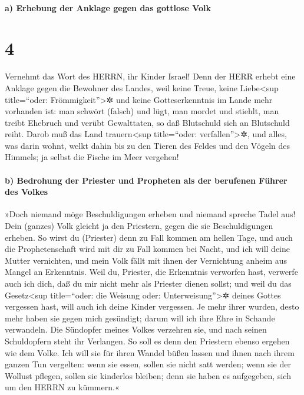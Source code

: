 \hypertarget{a-erhebung-der-anklage-gegen-das-gottlose-volk}{%
\paragraph{a) Erhebung der Anklage gegen das gottlose
Volk}\label{a-erhebung-der-anklage-gegen-das-gottlose-volk}}

\hypertarget{section-3}{%
\section{4}\label{section-3}}

 Vernehmt das Wort des HERRN, ihr Kinder Israel! Denn der
HERR erhebt eine Anklage gegen die Bewohner des Landes, weil keine
Treue, keine Liebe\textless sup title=``oder: Frömmigkeit''\textgreater✲
und keine Gotteserkenntnis im Lande mehr vorhanden ist: 
man schwört (falsch) und lügt, man mordet und stiehlt, man treibt
Ehebruch und verübt Gewalttaten, so daß Blutschuld sich an Blutschuld
reiht.  Darob muß das Land trauern\textless sup
title=``oder: verfallen''\textgreater✲, und alles, was darin wohnt,
welkt dahin bis zu den Tieren des Feldes und den Vögeln des Himmels; ja
selbst die Fische im Meer vergehen!

\hypertarget{b-bedrohung-der-priester-und-propheten-als-der-berufenen-fuxfchrer-des-volkes}{%
\paragraph{b) Bedrohung der Priester und Propheten als der berufenen
Führer des
Volkes}\label{b-bedrohung-der-priester-und-propheten-als-der-berufenen-fuxfchrer-des-volkes}}

 »Doch niemand möge Beschuldigungen erheben und niemand
spreche Tadel aus! Dein (ganzes) Volk gleicht ja den Priestern, gegen
die sie Beschuldigungen erheben.  So wirst du (Priester)
denn zu Fall kommen am hellen Tage, und auch die Prophetenschaft wird
mit dir zu Fall kommen bei Nacht, und ich will deine Mutter vernichten,
 und mein Volk fällt mit ihnen der Vernichtung anheim aus
Mangel an Erkenntnis. Weil du, Priester, die Erkenntnis verworfen hast,
verwerfe auch ich dich, daß du mir nicht mehr als Priester dienen
sollst; und weil du das Gesetz\textless sup title=``oder: die Weisung
oder: Unterweisung''\textgreater✲ deines Gottes vergessen hast, will
auch ich deine Kinder vergessen.  Je mehr ihrer wurden,
desto mehr haben sie gegen mich gesündigt; darum will ich ihre Ehre in
Schande verwandeln.  Die Sündopfer meines Volkes verzehren
sie, und nach seinen Schuldopfern steht ihr Verlangen.  So
soll es denn den Priestern ebenso ergehen wie dem Volke. Ich will sie
für ihren Wandel büßen lassen und ihnen nach ihrem ganzen Tun vergelten:
 wenn sie essen, sollen sie nicht satt werden; wenn sie
der Wollust pflegen, sollen sie kinderlos bleiben; denn sie haben es
aufgegeben, sich um den HERRN zu kümmern.«

